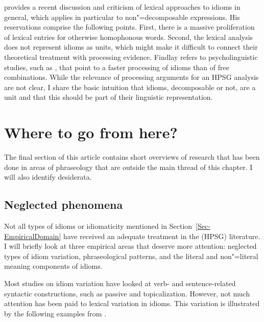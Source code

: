 \documentclass[output=paper,biblatex,babelshorthands,newtxmath,draftmode,colorlinks,citecolor=brown]{langscibook}
\begin{document}
\citet{Findlay:17} provides a recent discussion and criticism of lexical approaches to idioms in
general, which applies in particular to non"=decomposable expressions.  His reservations comprise
the following points.  First, there is a massive proliferation of lexical entries for otherwise
homophonous words.
%
Second, the lexical analysis does not represent idioms as units, which might make it difficult to
connect their theoretical treatment with processing evidence.  Findlay refers to psycholinguistic
studies, such as \citet{Swinney:Cutler:79}, that point to a faster processing of idioms than of free
combinations.  While the relevance of processing arguments for an HPSG analysis are not clear, I
share the basic intuition that idioms, decomposable or not, are a unit and that this should be part
of their linguistic representation.


\section{Where to go from here?}
\label{Sec-WhereToGo}

The final section of this article contains short overviews of research that has been done in areas
of phraseology that are outside the main thread of this chapter. I will also identify desiderata.


\subsection{Neglected phenomena}
\label{Sec-Neglected}

Not all types of idioms or idiomaticity mentioned in Section~\ref{Sec-EmpiricalDomain} have received
an adequate treatment in the (HPSG) literature.  I will briefly look at three empirical areas that
deserve more attention: neglected types of idiom variation, phraseological patterns, and the literal
and non"=literal meaning components of idioms.

Most studies on idiom variation have looked at verb- and sentence-related syntactic constructions,
such as passive and topicalization.  However, not much attention has been paid to lexical variation
in idioms. This variation is illustrated by the following examples from \citet[,
191]{Richards:01}.
\end{document}
